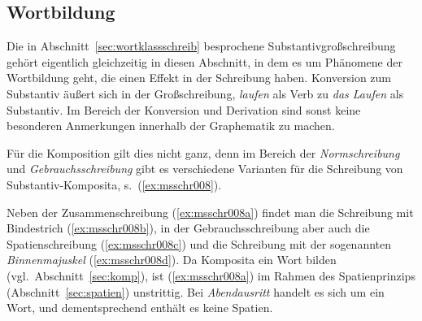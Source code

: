 \subsection{Wortbildung}

\label{sec:wortbildschreib}

Die in Abschnitt~\ref{sec:wortklassschreib} besprochene Substantivgroßschreibung gehört eigentlich gleichzeitig in diesen Abschnitt, in dem es um Phänomene der Wortbildung geht, die einen Effekt in der Schreibung haben.
Konversion zum Substantiv äußert sich in der Großschreibung, \zB \textit{laufen} als Verb zu \textit{das Laufen} als Substantiv.
Im Bereich der Konversion und Derivation sind sonst keine besonderen Anmerkungen innerhalb der Graphematik zu machen.

Für die Komposition gilt dies nicht ganz, denn im Bereich der \textit{Normschreibung} und \textit{Gebrauchsschreibung} gibt es verschiedene Varianten für die Schreibung von Substantiv-Komposita, s.\ (\ref{ex:msschr008}).
\begin{exe}
  \ex\label{ex:msschr008} 
  \begin{xlist}
  \end{xlist}
\end{exe}

Neben der Zusammenschreibung (\ref{ex:msschr008a}) findet man die Schreibung mit Bindestrich (\ref{ex:msschr008b}), in der Gebrauchsschreibung aber auch die Spatienschreibung (\ref{ex:msschr008c}) und die Schreibung mit der sogenannten \textit{Binnenmajuskel} (\ref{ex:msschr008d}).
Da Komposita ein Wort bilden (vgl.\ Abschnitt~\ref{sec:komp}), ist (\ref{ex:msschr008a}) im Rahmen des Spatienprinzips (Abschnitt~\ref{sec:spatien}) unstrittig.
Bei \textit{Abendausritt} handelt es sich um ein Wort, und dementsprechend enthält es keine Spatien.

